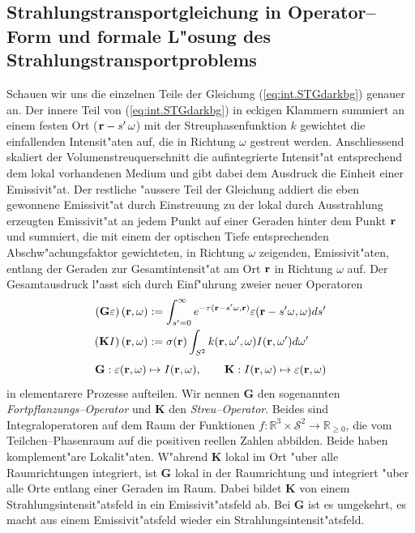 \documentclass[11pt,a4paper,DIVcalc,BCOR8mm,titlepage,twoside]{scrartcl}
\begin{document}
	\subsection{Strahlungstransportgleichung in Operator--Form und formale L"osung des Strahlungstransportproblems}
	Schauen wir uns die einzelnen Teile der Gleichung (\ref{eq:int.STGdarkbg}) genauer an.
	Der innere Teil von (\ref{eq:int.STGdarkbg}) in eckigen Klammern summiert an einem festen Ort ($\mathbf{r}-s'\,\omega$) mit der Streuphasenfunktion $k$ gewichtet die einfallenden Intensit"aten auf, die in Richtung $\omega$ gestreut werden. Anschliessend skaliert der Volumenstreuquerschnitt die aufintegrierte Intensit"at entsprechend dem lokal vorhandenen Medium und gibt dabei dem Ausdruck die Einheit einer Emissivit"at.
	Der restliche "aussere Teil der Gleichung addiert die eben gewonnene Emissivit"at durch Einstreuung zu der lokal durch Ausstrahlung erzeugten Emissivit"at an jedem Punkt auf einer Geraden hinter dem Punkt $\mathbf{r}$ und summiert, die mit einem der optischen Tiefe entsprechenden Abschw"achungsfaktor gewichteten, in Richtung $\omega$ zeigenden, Emissivit"aten, entlang der Geraden zur Gesamtintensit"at am Ort $\mathbf{r}$ in Richtung $\omega$ auf.
	Der Gesamtausdruck l"asst sich durch Einf"uhrung zweier neuer Operatoren
	\begin{align*}
		\left(\mathbf{G}\varepsilon\right)(\mathbf{r},\omega)&:=\int_{s'=0}^\infty e^{-\tau(\mathbf{r}-s' \omega,\mathbf{r})}\varepsilon(\mathbf{r}-s' \omega,\omega) ds' \\
		\left(\mathbf{K}I\right)(\mathbf{r},\omega)&:=\sigma(\mathbf{r})\int_{S^2} k(\mathbf{r},\omega',\omega) I(\mathbf{r},\omega') d\omega'
	\end{align*}
	\begin{equation*}
		\mathbf{G} : \varepsilon(\mathbf{r},\omega) \mapsto I(\mathbf{r},\omega) , \qquad
		\mathbf{K} : I(\mathbf{r},\omega) \mapsto \varepsilon(\mathbf{r},\omega)
	\end{equation*}
	in elementarere Prozesse aufteilen. Wir nennen $\mathbf{G}$ den sogenannten {\em Fortpflanzungs--Operator} und $\mathbf{K}$ den {\em Streu--Operator}. Beides sind Integraloperatoren auf dem Raum der Funktionen $f : \mathbb{R}^3 \times \mathcal{S}^2 \to \mathbb{R}_{\geq 0}$, die vom Teilchen--Phasenraum auf die positiven reellen Zahlen abbilden. Beide haben komplement"are Lokalit"aten. W"ahrend $\mathbf{K}$ lokal im Ort "uber alle Raumrichtungen integriert, ist $\mathbf{G}$ lokal in der Raumrichtung und integriert "uber alle Orte entlang einer Geraden im Raum. Dabei bildet $\mathbf{K}$ von einem Strahlungsintensit"atsfeld in ein Emissivit"atsfeld ab. Bei $\mathbf{G}$ ist es umgekehrt, es macht aus einem Emissivit"atsfeld wieder ein Strahlungsintensit"atsfeld.
\end{document}
